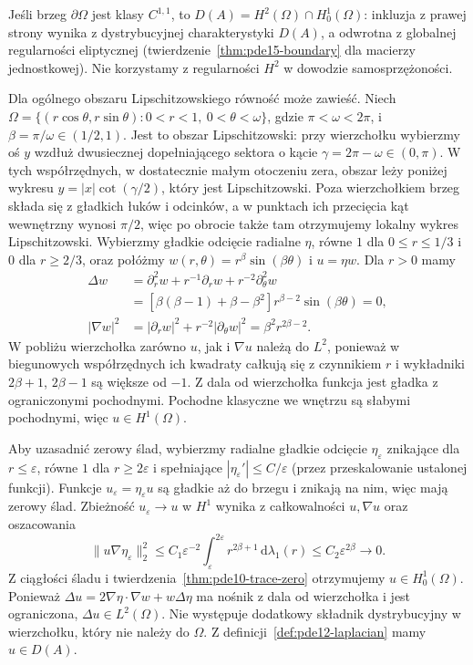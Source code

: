 \begin{uwaga}
\label{rem:pde12-corners}
Jeśli brzeg $\partial\Omega$ jest klasy $C^{1,1}$, to
$D(A)=H^2(\Omega)\cap H_0^1(\Omega)$: inkluzja z prawej
strony wynika z dystrybucyjnej charakterystyki $D(A)$,
a odwrotna z globalnej regularności eliptycznej
(twierdzenie~\ref{thm:pde15-boundary} dla macierzy jednostkowej).
Nie korzystamy z regularności $H^2$ w dowodzie samosprzężoności.

Dla ogólnego obszaru Lipschitzowskiego równość może zawieść.
Niech $\Omega=\{(r\cos\theta,r\sin\theta):0<r<1,\
0<\theta<\omega\}$, gdzie $\pi<\omega<2\pi$, i
$\beta=\pi/\omega\in(1/2,1)$. Jest to obszar Lipschitzowski:
przy wierzchołku wybierzmy oś $y$ wzdłuż dwusiecznej
dopełniającego sektora o kącie $\gamma=2\pi-\omega\in(0,\pi)$.
W tych współrzędnych, w dostatecznie małym otoczeniu zera,
obszar leży poniżej wykresu $y=|x|\cot(\gamma/2)$,
który jest Lipschitzowski. Poza wierzchołkiem brzeg
składa się z gładkich łuków i odcinków, a w punktach
ich przecięcia kąt wewnętrzny wynosi $\pi/2$, więc
po obrocie także tam otrzymujemy lokalny wykres
Lipschitzowski.
Wybierzmy gładkie odcięcie radialne $\eta$, równe $1$
dla $0\le r\le1/3$ i $0$ dla $r\ge2/3$, oraz połóżmy
$w(r,\theta)=r^\beta\sin(\beta\theta)$ i $u=\eta w$.
Dla $r>0$ mamy
\[
 \begin{aligned}
 \Delta w&=\partial_r^2 w+r^{-1}\partial_r w+
 r^{-2}\partial_\theta^2 w\\
 &= [\beta(\beta-1)+\beta-\beta^2]r^{\beta-2}
 \sin(\beta\theta)=0,\\
 |\nabla w|^2&=|\partial_r w|^2+r^{-2}|\partial_\theta w|^2
 =\beta^2r^{2\beta-2}.
 \end{aligned}
\]
W pobliżu wierzchołka zarówno $u$, jak i $\nabla u$
należą do $L^2$, ponieważ w biegunowych współrzędnych
ich kwadraty całkują się z czynnikiem $r$ i wykładniki
$2\beta+1$, $2\beta-1$ są większe od $-1$.
Z dala od wierzchołka funkcja jest gładka z ograniczonymi
pochodnymi. Pochodne klasyczne we wnętrzu są słabymi
pochodnymi, więc $u\in H^1(\Omega)$.

Aby uzasadnić zerowy ślad, wybierzmy radialne gładkie
odcięcie $\eta_\varepsilon$ znikające dla $r\le\varepsilon$,
równe $1$ dla $r\ge2\varepsilon$ i spełniające
$|\eta_\varepsilon'|\le C/\varepsilon$ (przez przeskalowanie
ustalonej funkcji). Funkcje $u_\varepsilon=\eta_\varepsilon u$
są gładkie aż do brzegu i znikają na nim, więc mają
zerowy ślad. Zbieżność $u_\varepsilon\to u$ w $H^1$
wynika z całkowalności $u,\nabla u$ oraz oszacowania
\[
 \|u\nabla\eta_\varepsilon\|_2^2
 \le C_1\varepsilon^{-2}\int_\varepsilon^{2\varepsilon}
 r^{2\beta+1}\,\mathrm d\lambda_1(r)
 \le C_2\varepsilon^{2\beta}\longrightarrow0.
\]
Z ciągłości śladu i twierdzenia~\ref{thm:pde10-trace-zero}
otrzymujemy $u\in H_0^1(\Omega)$.
Ponieważ $\Delta u=2\nabla\eta\cdot\nabla w+w\Delta\eta$
ma nośnik z dala od wierzchołka i jest ograniczona,
$\Delta u\in L^2(\Omega)$. Nie występuje dodatkowy składnik
dystrybucyjny w wierzchołku, który nie należy do $\Omega$.
Z definicji~\ref{def:pde12-laplacian} mamy $u\in D(A)$.


\end{uwaga}
